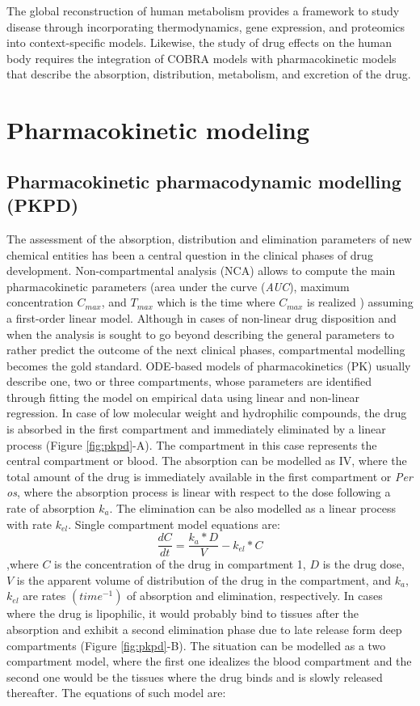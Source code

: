 The global reconstruction of human metabolism provides a framework to study disease through incorporating thermodynamics, gene expression, and proteomics into context-specific models. Likewise, the study of drug effects on the human body requires the integration of COBRA models with pharmacokinetic models that describe the absorption, distribution, metabolism, and excretion of the drug.
\section{Pharmacokinetic modeling}
\subsection{Pharmacokinetic pharmacodynamic modelling (PKPD)}
The assessment of the absorption, distribution and elimination parameters of new chemical entities has been a central question in the clinical phases of drug development. Non-compartmental analysis (NCA) allows to compute the main pharmacokinetic parameters (area under the curve (\textit{AUC}), maximum concentration $C_{max}$, and $T_{max}$ which is the time where $C_{max}$ is realized ) assuming a first-order linear model. Although in cases of non-linear drug disposition and when the analysis is sought to go beyond describing the general parameters to rather predict the outcome of the next clinical phases, compartmental modelling becomes the gold standard. ODE-based models of pharmacokinetics (PK) usually describe one, two or three compartments, whose parameters are identified through fitting the model on empirical data using linear and non-linear regression. In case of low molecular weight and hydrophilic compounds, the drug is absorbed in the first compartment and immediately eliminated by a linear process (Figure \ref{fig:pkpd}-A). The compartment in this case represents the central compartment or blood. The absorption can be modelled as IV, where the total amount of the drug is immediately available in the first compartment or \textit{Per os}, where the absorption process is linear with respect to the dose following a rate of absorption $k_{a}$. The elimination can be also modelled as a linear process with rate $k_{el}$. Single compartment model equations are:
\begin{equation}
\frac{dC}{dt}=\frac{k_{a}*D}{V}-k_{el}*C 
\end{equation}
,where $C$ is the concentration of the drug in compartment 1, $D$ is the drug dose, $V$ is the apparent volume of distribution of the drug in the compartment, and $k_{a}$, $k_{el}$ are rates $(time^{-1})$ of absorption and elimination, respectively. In cases where the drug is lipophilic, it would probably bind to tissues after the absorption and exhibit a second elimination phase due to late release form deep compartments (Figure \ref{fig:pkpd}-B). The situation can be modelled as a two compartment model, where the first one idealizes the blood compartment and the second one would be the tissues where the drug binds and is slowly released thereafter. The equations of such model are:
